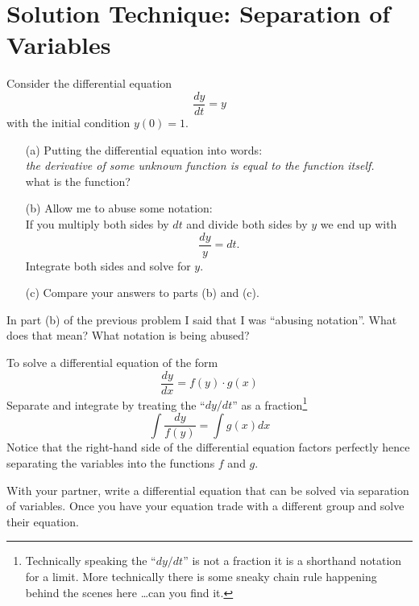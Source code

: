 \section{Solution Technique: Separation of Variables}
\begin{problem}
    Consider the differential equation 
    \[ \frac{dy}{dt} = y \]
    with the initial condition $y(0) = 1$.
    \begin{enumerate}
        \item[(a)] Putting the differential equation into words: \\ {\it the derivative of
            some unknown function is equal to the function itself.} \\
            what is the function?
        \item[(b)] Allow me to abuse some notation: \\
            If you multiply both sides by $dt$ and divide both sides by $y$ we end up with
            \[ \frac{dy}{y} = dt. \]
            Integrate both sides and solve for $y$.
        \item[(c)] Compare your answers to parts (b) and (c).
    \end{enumerate}
\end{problem}

\begin{problem}
    In part (b) of the previous problem I said that I was ``abusing notation''.  What does
    that mean?  What notation is being abused?
\end{problem}

\begin{technique}
    To solve a differential equation of the form
    \[ \frac{dy}{dx} = f(y)\cdot g(x) \]
    Separate and integrate by treating the ``$dy/dt$'' as a fraction\footnote{Technically
        speaking the ``$dy/dt$'' is not a fraction it is a shorthand notation for a
    limit.  More technically there is some sneaky chain rule happening behind the scenes
here \ldots can you find it.}
    \[ \int \frac{dy}{f(y)} = \int g(x) dx \]
    Notice that the right-hand side of the differential equation factors perfectly hence
    separating the variables into the functions $f$ and $g$.
\end{technique}

\begin{problem}
    With your partner, write a differential equation that can be solved via separation of
    variables.  Once you have your equation trade with a different group and solve their
    equation.
\end{problem}

